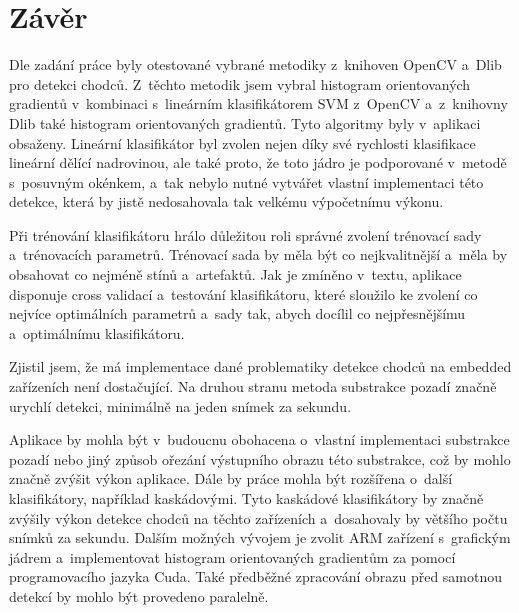 \section{Závěr}
Dle zadání práce byly otestované vybrané metodiky z~knihoven OpenCV a~Dlib pro detekci chodců. Z~těchto metodik jsem vybral histogram orientovaných gradientů v~kombinaci s~lineárním klasifikátorem SVM z~OpenCV a~z~knihovny Dlib také histogram orientovaných gradientů. Tyto algoritmy byly v~aplikaci obsaženy. Lineární klasifikátor byl zvolen nejen díky své rychlosti klasifikace lineární dělící nadrovinou, ale také proto, že toto jádro je podporované v~metodě s~posuvným okénkem, a~tak nebylo nutné vytvářet vlastní implementaci této detekce, která by jistě nedosahovala tak velkému výpočetnímu výkonu. 

Při trénování klasifikátoru hrálo důležitou roli správné zvolení trénovací sady a~trénovacích parametrů. Trénovací sada by měla být co nejkvalitnější a~měla by obsahovat co nejméně stínů a~artefaktů. Jak je zmíněno v~textu, aplikace disponuje cross validací a~testování klasifikátoru, které sloužilo ke zvolení co nejvíce optimálních parametrů a~sady tak, abych docílil co nejpřesnějšímu a~optimálnímu klasifikátoru.

Zjistil jsem, že má implementace dané problematiky detekce chodců na embedded zařízeních není dostačující. Na druhou stranu metoda substrakce pozadí značně urychlí detekci, minimálně na jeden snímek za sekundu.

Aplikace by mohla být v~budoucnu obohacena o~vlastní implementaci substrakce pozadí nebo jiný způsob ořezání výstupního obrazu této substrakce, což by mohlo značně zvýšit výkon aplikace. Dále by práce mohla být rozšířena o~další klasifikátory, například kaskádovými. Tyto kaskádové klasifikátory by značně zvýšily výkon detekce chodců na těchto zařízeních a~dosahovaly by většího počtu snímků za sekundu. Dalším možných vývojem je zvolit ARM zařízení s~grafickým jádrem a~implementovat histogram orientovaných gradientům za pomocí programovacího jazyka Cuda. Také předběžné zpracování obrazu před samotnou detekcí by mohlo být provedeno paralelně.


